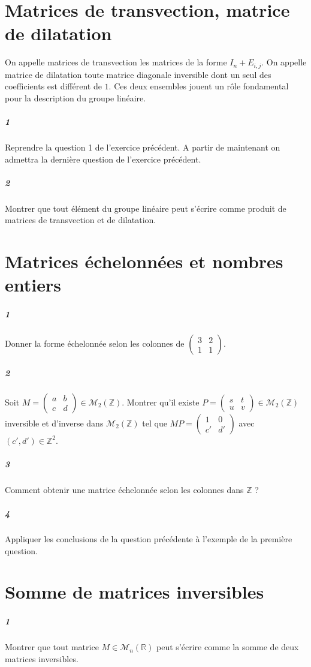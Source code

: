 \documentclass[10pt,a4paper]{article}
\begin{document}
\section{Matrices de transvection, matrice de dilatation}
On appelle matrices de transvection les matrices de la forme $I_n+E_{i,j}$. On appelle matrice de dilatation toute matrice diagonale inversible dont un seul des coefficients est différent de $1$. Ces deux ensembles jouent un rôle fondamental pour la description du groupe linéaire.
\subparagraph{1}Reprendre la question 1 de l'exercice précédent. A partir de maintenant on admettra la dernière question de l'exercice précédent.
\subparagraph{2}Montrer que tout élément du groupe linéaire peut s'écrire comme produit de matrices de transvection et de dilatation.

\section{Matrices échelonnées et nombres entiers}
\subparagraph{1}Donner la forme échelonnée selon les colonnes de $\left( \begin{matrix} 3 & 2 \\1 & 1\end{matrix}\right)$.
\subparagraph{2} Soit $M=\left( \begin{matrix} a & b \\ c & d \end{matrix} \right) \in \mathcal{M}_2 \left( \mathbb{Z} \right)$. Montrer qu'il existe $P=\left( \begin{matrix} s & t \\ u & v \end{matrix} \right) \in \mathcal{M}_2 \left( \mathbb{Z} \right)$ inversible et d'inverse dans $\mathcal{M}_2 \left( \mathbb{Z} \right)$ tel que $MP = \left( \begin{matrix} 1 & 0 \\ c' & d' \end{matrix} \right)$ avec $(c',d') \in \mathbb{Z}^2$.
\subparagraph{3}Comment obtenir une matrice échelonnée selon les colonnes dans $\mathbb{Z}$ ?
\subparagraph{4}Appliquer les conclusions de la question précédente à l'exemple de la première question.


\section{Somme de matrices inversibles}
\subparagraph{1}Montrer que tout matrice $M \in \mathcal{M}_n \left( \mathbb{R} \right)$ peut s'écrire comme la somme de deux matrices inversibles.
\end{document}
